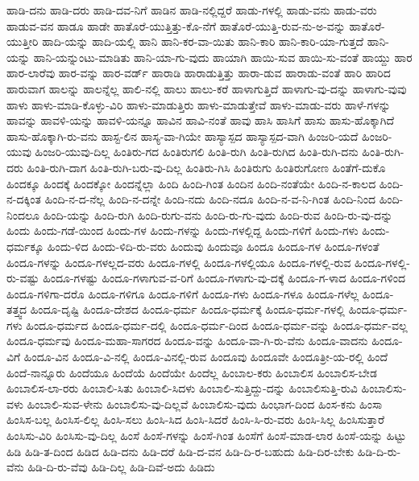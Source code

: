 {ಹಾಡಿ-ದನು
ಹಾಡಿ-ದರು
ಹಾಡಿ-ದವ-ನಿಗೆ
ಹಾಡಿನ
ಹಾಡಿ-ನಲ್ಲಿದ್ದರೆ
ಹಾಡು-ಗಳಲ್ಲಿ
ಹಾಡು-ವನು
ಹಾಡು-ವರು
ಹಾಡುವ-ವನ
ಹಾಡೂ
ಹಾಡೇ
ಹಾತೊರೆ-ಯುತ್ತಿತ್ತು-ಕೊ-ನೆಗೆ
ಹಾತೊರೆ-ಯುತ್ತಿ-ರುವ-ನು-ಅ-ವನ್ನು
ಹಾತೊರೆ-ಯುತ್ತೀರಿ
ಹಾದಿ-ಯನ್ನು
ಹಾದಿ-ಯಲ್ಲಿ
ಹಾನಿ
ಹಾನಿ-ಕರ-ವಾ-ಯಿತು
ಹಾನಿ-ಕಾರಿ
ಹಾನಿ-ಕಾರಿ-ಯಾ-ಗುತ್ತದೆ
ಹಾನಿ-ಯನ್ನು
ಹಾನಿ-ಯನ್ನುಂಟು-ಮಾಡಿತು
ಹಾನಿ-ಯಾ-ಗು-ವುದು
ಹಾಯಾಗಿ
ಹಾಯಿ-ಸುವ
ಹಾಯಿ-ಸು-ವಂತೆ
ಹಾಯ್ದು
ಹಾರ
ಹಾರ-ಲಾರೆವು
ಹಾರ-ವನ್ನು
ಹಾರ-ವರ್ಡ್
ಹಾರಾಡಿ
ಹಾರಾಡುತ್ತಿತ್ತು
ಹಾರಾ-ಡುವ
ಹಾರಾಡು-ವಂತೆ
ಹಾರಿ
ಹಾರಿದ
ಹಾರುವಾಗ
ಹಾಲನ್ನು
ಹಾಲನ್ನೆಲ್ಲ
ಹಾಲಿ-ನಲ್ಲಿ
ಹಾಲು
ಹಾಲು-ಕರೆ
ಹಾಳಾಗುತ್ತಿದೆ
ಹಾಳಾಗು-ವು-ದನ್ನು
ಹಾಳಾಗು-ವುವು
ಹಾಳು
ಹಾಳು-ಮಾಡಿ-ಕೊಳ್ಳು-ವಿರಿ
ಹಾಳು-ಮಾಡುತ್ತಿರು
ಹಾಳು-ಮಾಡುತ್ತೇವೆ
ಹಾಳು-ಮಾಡು-ವರು
ಹಾಳೆ-ಗಳನ್ನು
ಹಾವನ್ನು
ಹಾವಳಿ-ಯನ್ನು
ಹಾವಳಿ-ಯನ್ನೂ
ಹಾವಿನ
ಹಾವಿ-ನಂತೆ
ಹಾವು
ಹಾಸಿ
ಹಾಸಿಗೆ
ಹಾಸು
ಹಾಸು-ಹೊಕ್ಕಾಗಿದೆ
ಹಾಸು-ಹೊಕ್ಕಾಗಿ-ರು-ವನು
ಹಾಸ್ಟ-ಲಿನ
ಹಾಸ್ಯ-ವಾ-ಗಿಯೇ
ಹಾಸ್ಯಾಸ್ಪದ
ಹಾಸ್ಯಾಸ್ಪದ-ವಾಗಿ
ಹಿಂಜರಿ-ಯದೆ
ಹಿಂಜರಿ-ಯುವು
ಹಿಂಜರಿ-ಯುವು-ದಿಲ್ಲ
ಹಿಂತಿರು-ಗದ
ಹಿಂತಿರುಗಲಿ
ಹಿಂತಿ-ರುಗಿ
ಹಿಂತಿ-ರುಗಿದ
ಹಿಂತಿ-ರುಗಿ-ದನು
ಹಿಂತಿ-ರುಗಿ-ದರು
ಹಿಂತಿ-ರುಗಿ-ದಾಗ
ಹಿಂತಿ-ರುಗಿ-ಬರು-ವು-ದಿಲ್ಲ
ಹಿಂತಿರು-ಗಿಸಿ
ಹಿಂತಿರುಗು
ಹಿಂತಿರುಗೋಣ
ಹಿಂತೆಗೆ-ದುಕೊ
ಹಿಂದಕ್ಕೂ
ಹಿಂದಕ್ಕೆ
ಹಿಂದಕ್ಕೋ
ಹಿಂದನ್ನೆಲ್ಲಾ
ಹಿಂದಿ
ಹಿಂದಿ-ಗಿಂತ
ಹಿಂದಿನ
ಹಿಂದಿ-ನಂತೆಯೇ
ಹಿಂದಿ-ನ-ಕಾಲದ
ಹಿಂದಿ-ನ-ದಕ್ಕಿಂತ
ಹಿಂದಿ-ನ-ದ-ನೆಲ್ಲ
ಹಿಂದಿ-ನ-ದನ್ನೇ
ಹಿಂದಿ-ನದು
ಹಿಂದಿ-ನದೂ
ಹಿಂದಿ-ನ-ವ-ನಿ-ಗಿಂತ
ಹಿಂದಿ-ನಿಂದ
ಹಿಂದಿ-ನಿಂದಲೂ
ಹಿಂದಿ-ಯನ್ನು
ಹಿಂದಿ-ರುಗಿ
ಹಿಂದಿ-ರುಗು-ವನು
ಹಿಂದಿ-ರು-ಗು-ವುದು
ಹಿಂದಿ-ರುವ
ಹಿಂದಿ-ರು-ವು-ದನ್ನು
ಹಿಂದು
ಹಿಂದು-ಗಡೆ-ಯಿಂದ
ಹಿಂದು-ಗಳ
ಹಿಂದು-ಗಳನ್ನು
ಹಿಂದು-ಗಳಲ್ಲಿದ್ದ
ಹಿಂದು-ಗಳಿಗೆ
ಹಿಂದು-ಗಳು
ಹಿಂದು-ಧರ್ಮಕ್ಕೂ
ಹಿಂದು-ಳಿದ
ಹಿಂದು-ಳಿದಿ-ರು-ವರು
ಹಿಂದುವು
ಹಿಂದುವೂ
ಹಿಂದೂ
ಹಿಂದೂ-ಗಳ
ಹಿಂದೂ-ಗಳಂತೆ
ಹಿಂದೂ-ಗಳನ್ನು
ಹಿಂದೂ-ಗಳಲ್ಲದ-ವರು
ಹಿಂದೂ-ಗಳಲ್ಲಿ
ಹಿಂದೂ-ಗಳಲ್ಲಿಯೂ
ಹಿಂದೂ-ಗಳಲ್ಲಿ-ರುವ
ಹಿಂದೂ-ಗಳಲ್ಲಿ-ರು-ವಷ್ಟು
ಹಿಂದೂ-ಗಳಷ್ಟು
ಹಿಂದೂ-ಗಳಾಗುವ-ವ-ರಿಗೆ
ಹಿಂದೂ-ಗಳಾಗು-ವು-ದಕ್ಕೆ
ಹಿಂದೂ-ಗ-ಳಾದ
ಹಿಂದೂ-ಗಳಿಂದ
ಹಿಂದೂ-ಗಳಿಗಾ-ದರೊ
ಹಿಂದೂ-ಗಳಿಗೂ
ಹಿಂದೂ-ಗಳಿಗೆ
ಹಿಂದೂ-ಗಳು
ಹಿಂದೂ-ಗಳೂ
ಹಿಂದೂ-ಗಳೆಲ್ಲ
ಹಿಂದೂ-ತತ್ತ್ವದ
ಹಿಂದೂ-ದೃಷ್ಟಿ
ಹಿಂದೂ-ದೇಶದ
ಹಿಂದೂ-ಧರ್ಮ
ಹಿಂದೂ-ಧರ್ಮಕ್ಕೆ
ಹಿಂದೂ-ಧರ್ಮ-ಗಳಲ್ಲಿ
ಹಿಂದೂ-ಧರ್ಮ-ಗಳು
ಹಿಂದೂ-ಧರ್ಮದ
ಹಿಂದೂ-ಧರ್ಮ-ದಲ್ಲಿ
ಹಿಂದೂ-ಧರ್ಮ-ದಿಂದ
ಹಿಂದೂ-ಧರ್ಮ-ವನ್ನು
ಹಿಂದೂ-ಧರ್ಮ-ವಲ್ಲ
ಹಿಂದೂ-ಧರ್ಮವು
ಹಿಂದೂ-ಮಹಾ-ಸಾಗರದ
ಹಿಂದೂ-ವನ್ನು
ಹಿಂದೂ-ವಾ-ಗಿ-ರು-ವೆನು
ಹಿಂದೂ-ವಾದನು
ಹಿಂದೂ-ವಿಗೆ
ಹಿಂದೂ-ವಿನ
ಹಿಂದೂ-ವಿ-ನಲ್ಲಿ
ಹಿಂದೂ-ವಿನಲ್ಲಿ-ರುವ
ಹಿಂದೂವು
ಹಿಂದೂವೇ
ಹಿಂದೂತ್ರೀ-ಯ-ರಲ್ಲಿ
ಹಿಂದೆ
ಹಿಂದೆ-ನಾನ್ನೂರು
ಹಿಂದೆಯೂ
ಹಿಂದೆಯೆ
ಹಿಂದೆಯೇ
ಹಿಂದೆಲ್ಲ
ಹಿಂಬಾಲ-ಕರು
ಹಿಂಬಾಲಿಸ
ಹಿಂಬಾಲಿಸ-ಬೇಡ
ಹಿಂಬಾಲಿಸ-ಲಾ-ರರು
ಹಿಂಬಾಲಿ-ಸಿತು
ಹಿಂಬಾಲಿ-ಸಿದಳು
ಹಿಂಬಾಲಿ-ಸುತ್ತಿದ್ದು-ದನ್ನು
ಹಿಂಬಾಲಿಸುತ್ತಿ-ರುವಿ
ಹಿಂಬಾಲಿಸು-ವಳು
ಹಿಂಬಾಲಿ-ಸುವ-ಳೇನು
ಹಿಂಬಾಲಿಸು-ವು-ದಿಲ್ಲವೆ
ಹಿಂಬಾಲಿಸು-ವುದು
ಹಿಂಭಾಗ-ದಿಂದ
ಹಿಂಸ-ಕನು
ಹಿಂಸಾ
ಹಿಂಸಿಸ-ಬಲ್ಲ
ಹಿಂಸಿಸ-ಲಿಲ್ಲ
ಹಿಂಸಿ-ಸಲು
ಹಿಂಸಿ-ಸಿದ
ಹಿಂಸಿ-ಸಿದರೆ
ಹಿಂಸಿ-ಸಿ-ರು-ವರು
ಹಿಂಸಿ-ಸಿಲ್ಲ
ಹಿಂಸಿಸುತ್ತಾರೆ
ಹಿಂಸಿಸು-ವಿರಿ
ಹಿಂಸಿಸು-ವು-ದಿಲ್ಲ
ಹಿಂಸೆ
ಹಿಂಸೆ-ಗಳನ್ನು
ಹಿಂಸೆ-ಗಿಂತ
ಹಿಂಸೆಗೆ
ಹಿಂಸೆ-ಮಾಡ-ಲಾರ
ಹಿಂಸೆ-ಯನ್ನು
ಹಿಟ್ಟು
ಹಿಡಿ
ಹಿಡಿ-ತ-ದಿಂದ
ಹಿಡಿದ
ಹಿಡಿ-ದನು
ಹಿಡಿ-ದರೆ
ಹಿಡಿ-ದ-ವನ
ಹಿಡಿ-ದಿ-ರ-ಬಹುದು
ಹಿಡಿ-ದಿರ-ಬೇಕು
ಹಿಡಿ-ದಿ-ರು-ವೆನು
ಹಿಡಿ-ದಿ-ರು-ವೆವು
ಹಿಡಿ-ದಿಲ್ಲ
ಹಿಡಿ-ದಿವೆ-ಅದು
ಹಿಡಿದು
}

